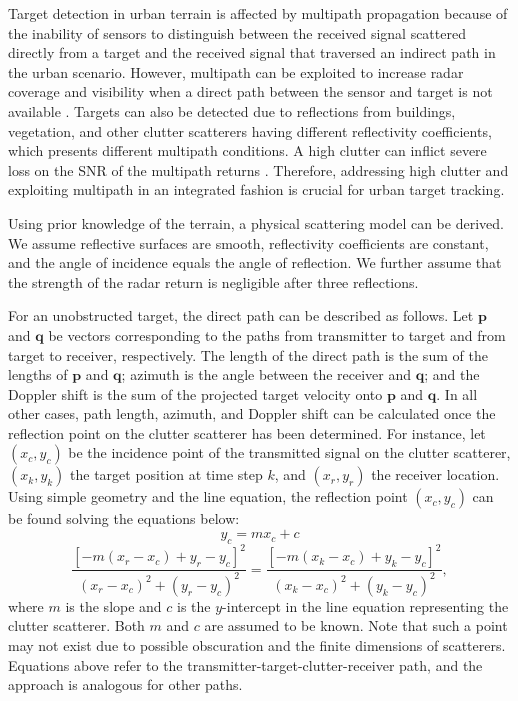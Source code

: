 \documentclass[times]{asjcauth}
\begin{document}
Target detection in urban terrain is affected by multipath propagation because of the inability of sensors to distinguish between the received signal scattered directly from a target and the received signal that traversed an indirect path in the urban scenario. However, multipath can be exploited to increase radar coverage and visibility when a direct path between the sensor and target is not available \cite{chak1}. Targets can also be detected due to reflections from buildings, vegetation, and other clutter scatterers having different reflectivity coefficients, which presents different multipath conditions. A high clutter can inflict severe loss on the SNR of the multipath returns \cite{chak2}. Therefore, addressing high clutter and exploiting multipath in an integrated fashion is crucial for urban target tracking.

Using prior knowledge of the terrain, a physical scattering model can be derived. We assume reflective surfaces are smooth, reflectivity coefficients are constant, and the angle of incidence equals the angle of reflection. We further assume that the strength of the radar return is negligible after three reflections.

For an unobstructed target, the direct path can be described as follows. Let $\mathbf{p}$ and $\mathbf{q}$ be vectors corresponding to the paths from transmitter to target and from target to receiver, respectively. The length of the direct path is the sum of the lengths of $\mathbf{p}$ and $\mathbf{q}$; azimuth is the angle between the receiver and $\mathbf{q}$; and the Doppler shift is the sum of the projected target velocity onto $\mathbf{p}$ and $\mathbf{q}$. In all other cases, path length, azimuth, and Doppler shift can be calculated once the reflection point on the clutter scatterer has been determined. For instance, let $\left(x_{c},y_{c}\right)$ be the incidence point of the transmitted signal on the clutter scatterer, $\left(x_{k},y_{k}\right)$ the target position at time step $k$, and $\left(x_{r},y_{r}\right)$ the receiver location. Using simple geometry and the line equation, the reflection point $\left(x_{c},y_{c}\right)$ can be found solving the equations below:
\begin{equation*}\label{eqmultipath1}
y_{c} = mx_{c} + c
\end{equation*}
\begin{equation*}\label{eqmultipath2}
\dfrac{\left[-m(x_{r}-x_{c}) + y_{r}-y_{c}\right]^{2}}{(x_{r}-x_{c})^{2} + (y_{r}-y_{c})^{2}} = \dfrac{\left[-m(x_{k}-x_{c}) + y_{k}-y_{c}\right]^{2}}{(x_{k}-x_{c})^{2} + (y_{k}-y_{c})^{2}},
\end{equation*}
\noindent where $m$ is the slope and $c$ is the $y$-intercept in the line equation representing the clutter scatterer. Both $m$ and $c$ are assumed to be known. Note that such a point may not exist due to possible obscuration and the finite dimensions of scatterers. Equations above refer to the transmitter-target-clutter-receiver path, and the approach is analogous for other paths.
\end{document}

